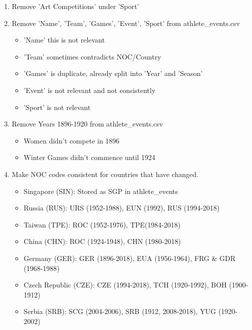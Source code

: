 \documentclass[a4 paper, 12pt]{article}
\begin{document}
        \begin{enumerate}
            \item Remove 'Art Competitions' under 'Sport'
            \item Remove 'Name', 'Team', 'Games', 'Event', 'Sport' from athlete\_events.csv
                \begin{itemize}
                    \item 'Name' this is not relevant
                    \item 'Team' sometimes contradicts NOC/Country
                    \item 'Games' is duplicate, already split into 'Year' and 'Season'
                    \item 'Event' is not relevant and not consistently
                    \item 'Sport' is not relevant        
                \end{itemize}
            \item Remove Years 1896-1920 from athlete\_events.csv
                \begin{itemize}
                    \item Women didn't compete in 1896
                    \item Winter Games didn't commence until 1924
                \end{itemize}
            \item Make NOC codes consistent for countries that have changed.            
               \begin{itemize}
                    \item Singapore (SIN): Stored as SGP in athlete\_events
                    \item Russia (RUS): URS (1952-1988), EUN (1992), RUS (1994-2018)
                    \item Taiwan (TPE): ROC (1952-1976), TPE(1984-2018)
                    \item China (CHN): ROC (1924-1948), CHN (1980-2018)
                    \item Germany (GER): GER (1896-2018), EUA (1956-1964), FRG \& GDR (1968-1988)
                    \item Czech Republic (CZE): CZE (1994-2018), TCH (1920-1992), BOH (1900-1912)
                    \item Serbia (SRB): SCG (2004-2006), SRB (1912, 2008-2018), YUG (1920-2002)
                \end{itemize}            

\end{enumerate}
\end{document}
